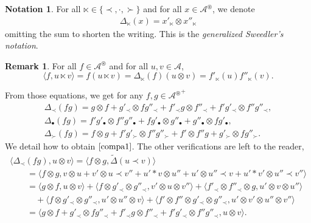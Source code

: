 \documentclass[10pt,a4paper]{amsart}
\numberwithin{equation}{section}
\theoremstyle{definition}
\newtheorem{Rq}[defi]{Remark}
\newtheorem{Not}[defi]{Notation}
\theoremstyle{plain}
\begin{document}
\begin{Not}
	 For all $\ltimes\in\{\prec,\cdot,\succ\}$ and for all $x\in \mathcal{A}^{\circledast}$, we denote
\begin{align*}
	\Delta_{\ltimes}(x)=x'_{\ltimes}\otimes x''_{\ltimes}
\end{align*}
omitting the sum to shorten the writing. This is the \emph{generalized Sweedler's notation}.
\end{Not}
\begin{Rq}
	For all $f\in \mathcal{A}^{\circledast}$ and for all $u,v\in \mathcal{A}$,
	\[
	 \langle f,u\ltimes v \rangle=f(u\ltimes v)=\Delta_{\ltimes}(f)(u\otimes v)=f'_{\ltimes}(u)f''_{\ltimes}(v).
	\]
\end{Rq}

From those equations, we get for any $f,g\in {\mathcal{A}^{\circledast}}^+$
\begin{gather}
	\Delta_{\prec}(fg)=g\otimes f+ g'_{\prec}\otimes fg''_{\prec}+f'_{\prec}g\otimes f''_{\prec}+f'g'_{\prec}\otimes f''g''_{\prec}, \label{compa1} \\
	\Delta_{\bullet}(fg)=f'g'_{\bullet}\otimes f''g''_{\bullet}+fg'_{\bullet}\otimes g''_{\bullet} + g''_{\bullet}\otimes fg'_{\bullet}, \label{compa2} \\
	\Delta_{\succ}(fg)=f\otimes g +f'g'_{\succ}\otimes f''g''_{\succ}+f'\otimes f''g+g'_{\succ}\otimes fg''_{\succ}. \label{compa3}	
\end{gather}
We detail how to obtain $\eqref{compa1}$. The other verifications are left to the reader,
\begin{gather*}
	\big\langle \Delta_{\prec}(fg),u\otimes v \big\rangle = \big\langle f\otimes g,\tilde\Delta(u\prec v) \big\rangle \\
	\qquad=\big\langle f\otimes g,v\otimes u+v'\otimes u\prec v''+u'*v\otimes u''+u'\otimes u''\prec v+u'*v'\otimes u''\prec v'' \big\rangle \\
	\qquad=\langle g\otimes f,u\otimes v \rangle+\big\langle f\otimes g'_{\prec}\otimes g''_{\prec}, v'\otimes u\otimes v'' \big\rangle+ \big\langle f'_{\prec}\otimes f''_{\prec}\otimes g,u'\otimes v\otimes u'' \big\rangle\\
	\qquad\quad+\big\langle f\otimes g'_{\prec} \otimes g''_{\prec},u'\otimes u''\otimes v \big\rangle+\big\langle f'\otimes f''\otimes g'_{\prec}\otimes g''_{\prec},u'\otimes v'\otimes u'' \otimes v'' \big\rangle \\
	\qquad= \big\langle g\otimes f+ g'_{\prec}\otimes fg''_{\prec}+f'_{\prec}g\otimes f''_{\prec}+f'g'_{\prec}\otimes f''g''_{\prec},u\otimes v \big\rangle.
\end{gather*}
\end{document}
